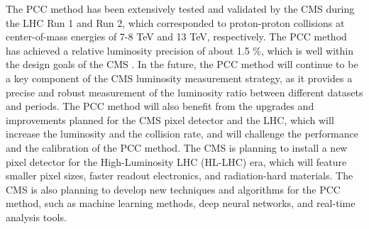 The PCC method has been extensively tested and validated by the CMS during the LHC Run 1 and Run 2, which corresponded to proton-proton collisions at center-of-mass energies of 7-8 TeV and 13 TeV, respectively. The PCC method has achieved a relative luminosity precision of about 1.5 \%, which is well within the design goals of the CMS \cite{CMS-PAS-LUM-18-002}. In the future, the PCC method will continue to be a key component of the CMS luminosity measurement strategy, as it provides a precise and robust measurement of the luminosity ratio between different datasets and periods. The PCC method will also benefit from the upgrades and improvements planned for the CMS pixel detector and the LHC, which will increase the luminosity and the collision rate, and will challenge the performance and the calibration of the PCC method. The CMS is planning to install a new pixel detector for the High-Luminosity LHC (HL-LHC) era, which will feature smaller pixel sizes, faster readout electronics, and radiation-hard materials. The CMS is also planning to develop new techniques and algorithms for the PCC method, such as machine learning methods, deep neural networks, and real-time analysis tools.




